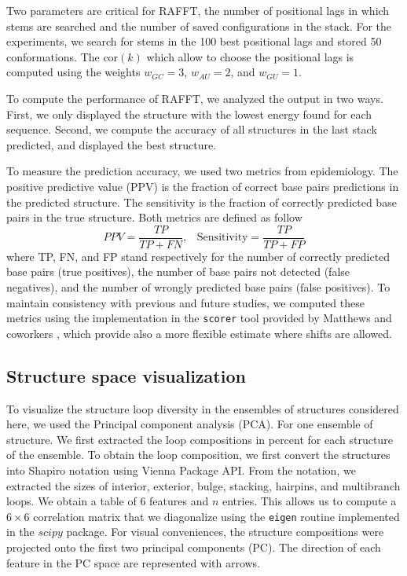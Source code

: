 \documentclass[a4paper,12pt]{article}
\begin{document}
Two parameters are critical for RAFFT, the number of positional lags in which
stems are searched and the number of saved configurations in the stack. For the
experiments, we search for stems in the 100 best positional lags and stored 50
conformations. The \(\text{cor}(k)\) which allow to choose the positional lags is
computed using the weights \(w_{GC}=3\), \(w_{AU}=2\), and \(w_{GU}=1\).

To compute the performance of RAFFT, we analyzed the output in two ways. First,
we only displayed the structure with the lowest energy found for each sequence.
Second, we compute the accuracy of all structures in the last stack predicted,
and displayed the best structure.

To measure the prediction accuracy, we used two metrics from epidemiology. The
positive predictive value (PPV) is the fraction of correct base pairs
predictions in the predicted structure. The sensitivity is the fraction of
correctly predicted base pairs in the true structure. Both metrics are defined
as follow
\begin{equation}
PPV = \frac{TP}{TP + FN}, \;\;\; \text{Sensitivity} = \frac{TP}{TP+FP}
\end{equation}
where TP, FN, and FP stand respectively for the number of correctly predicted
base pairs (true positives), the number of base pairs not detected (false
negatives), and the number of wrongly predicted base pairs (false positives). To
maintain consistency with previous and future studies, we computed these metrics
using the implementation in the \texttt{scorer} tool provided by Matthews and coworkers
\cite{mathews19_how_to_bench_rna_secon}, which provide also a more flexible
estimate where shifts are allowed.

\subsection*{Structure space visualization}
\label{sec:org632bee0}
To visualize the structure loop diversity in the ensembles of structures
considered here, we used the Principal component analysis (PCA). For one
ensemble of structure. We first extracted the loop compositions in percent for
each structure of the ensemble. To obtain the loop composition, we first convert
the structures into Shapiro notation using Vienna Package API. From the
notation, we extracted the sizes of interior, exterior, bulge, stacking,
hairpins, and multibranch loops. We obtain a table of 6 features and \(n\)
entries. This allows us to compute a \(6\times 6\) correlation matrix that we
diagonalize using the \texttt{eigen} routine implemented in the \(scipy\) package. For
visual conveniences, the structure compositions were projected onto the first
two principal components (PC). The direction of each feature in the PC space are
represented with arrows.
\end{document}
